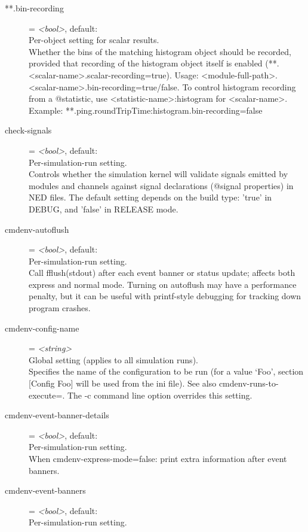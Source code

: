 \begin{description}
\item[**.bin-recording] = \textit{<bool>}, default: \\
    Per-object setting for scalar results.\\
    Whether the bins of the matching histogram object should be recorded,
    provided that recording of the histogram object itself is enabled
    (**.<scalar-name>.scalar-recording=true).  Usage:
    <module-full-path>.<scalar-name>.bin-recording=true/false. To control
    histogram recording from a @statistic, use <statistic-name>:histogram for
    <scalar-name>. Example: **.ping.roundTripTime:histogram.bin-recording=false
\item[check-signals] = \textit{<bool>}, default: \\
    Per-simulation-run setting.\\
    Controls whether the simulation kernel will validate signals emitted by
    modules and channels against signal declarations (@signal properties) in
    NED files. The default setting depends on the build type: 'true' in DEBUG,
    and 'false' in RELEASE mode.
\item[cmdenv-autoflush] = \textit{<bool>}, default: \\
    Per-simulation-run setting.\\
    Call fflush(stdout) after each event banner or status update; affects both
    express and normal mode. Turning on autoflush may have a performance
    penalty, but it can be useful with printf-style debugging for tracking down
    program crashes.
\item[cmdenv-config-name] = \textit{<string>}\\
    Global setting (applies to all simulation runs).\\
    Specifies the name of the configuration to be run (for a value `Foo',
    section [Config Foo] will be used from the ini file). See also
    cmdenv-runs-to-execute=. The -c command line option overrides this setting.
\item[cmdenv-event-banner-details] = \textit{<bool>}, default: \\
    Per-simulation-run setting.\\
    When cmdenv-express-mode=false: print extra information after event
    banners.
\item[cmdenv-event-banners] = \textit{<bool>}, default: \\
    Per-simulation-run setting.\\

\end{description}
